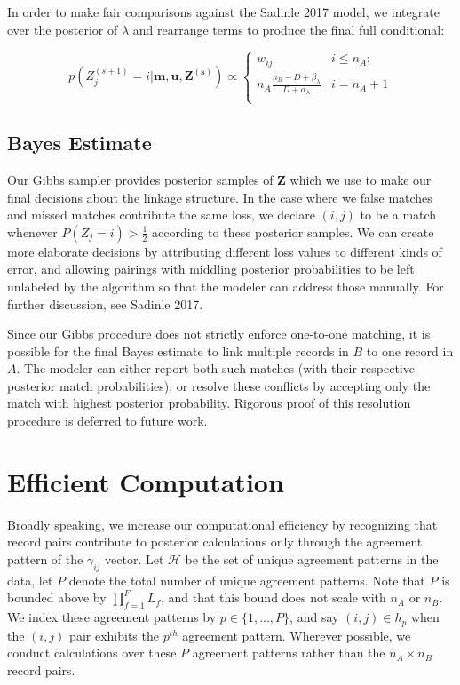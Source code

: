 \documentclass[
  12pt,
]{article}
\begin{document}
In order to make fair comparisons against the Sadinle 2017 model, we
integrate over the posterior of \(\lambda\) and rearrange terms to
produce the final full conditional:

\[p\left(Z_j^{(s+1)}  = i| \mathbf{m}, \mathbf{u}, \mathbf{Z^{(s)}}\right) \propto
\begin{cases} 
    w_{ij}  & i \leq n_A; \\
     n_A \frac{n_B - D + \beta_{\lambda}}{D + \alpha_{\lambda}} & i  = n_A + 1 \\
\end{cases}\]

\hypertarget{bayes-estimate}{%
\subsection{Bayes Estimate}\label{bayes-estimate}}

Our Gibbs sampler provides posterior samples of \(\mathbf{Z}\) which we
use to make our final decisions about the linkage structure. In the case
where we false matches and missed matches contribute the same loss, we
declare \((i,j)\) to be a match whenever \(P(Z_j = i) > \frac{1}{2}\)
according to these posterior samples. We can create more elaborate
decisions by attributing different loss values to different kinds of
error, and allowing pairings with middling posterior probabilities to be
left unlabeled by the algorithm so that the modeler can address those
manually. For further discussion, see Sadinle 2017.

Since our Gibbs procedure does not strictly enforce one-to-one matching,
it is possible for the final Bayes estimate to link multiple records in
\(B\) to one record in \(A\). The modeler can either report both such
matches (with their respective posterior match probabilities), or
resolve these conflicts by accepting only the match with highest
posterior probability. Rigorous proof of this resolution procedure is
deferred to future work.

\hypertarget{efficient-computation}{%
\section{Efficient Computation}\label{efficient-computation}}

Broadly speaking, we increase our computational efficiency by
recognizing that record pairs contribute to posterior calculations only
through the agreement pattern of the \(\gamma_{ij}\) vector. Let
\(\mathcal{H}\) be the set of unique agreement patterns in the data, let
\(P\) denote the total number of unique agreement patterns. Note that
\(P\) is bounded above by \(\prod_{f=1}^F L_f\), and that this bound
does not scale with \(n_A\) or \(n_B\). We index these agreement
patterns by \(p \in \{1, \ldots, P\}\), and say \((i,j) \in h_p\) when
the \((i,j)\) pair exhibits the \(p^{th}\) agreement pattern. Wherever
possible, we conduct calculations over these \(P\) agreement patterns
rather than the \(n_A \times n_B\) record pairs.
\end{document}
